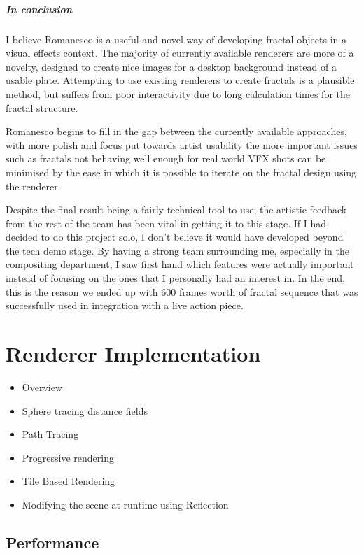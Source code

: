 \documentclass[11pt,a4paper,final,notitlepage]{report}
\begin{document}
\paragraph{In conclusion} I believe Romanesco is a useful and novel way of developing fractal objects in a visual effects context. The majority of currently available renderers are more of a novelty, designed to create nice images for a desktop background instead of a usable plate. Attempting to use existing renderers to create fractals is a plausible method, but suffers from poor interactivity due to long calculation times for the fractal structure.

Romanesco begins to fill in the gap between the currently available approaches, with more polish and focus put towards artist usability the more important issues such as fractals not behaving well enough for real world VFX shots can be minimised by the ease in which it is possible to iterate on the fractal design using the renderer.

Despite the final result being a fairly technical tool to use, the artistic feedback from the rest of the team has been vital in getting it to this stage. If I had decided to do this project solo, I don't believe it would have developed beyond the tech demo stage. By having a strong team surrounding me, especially in the compositing department, I saw first hand which features were actually important instead of focusing on the ones that I personally had an interest in. In the end, this is the reason we ended up with 600 frames worth of fractal sequence that was successfully used in integration with a live action piece.

\chapter{Renderer Implementation}

\begin{itemize}
	\item Overview
	\item Sphere tracing distance fields
	\item Path Tracing
	\item Progressive rendering
	\item Tile Based Rendering
	\item Modifying the scene at runtime using Reflection
\end{itemize}

\section{Performance}
\end{document}
